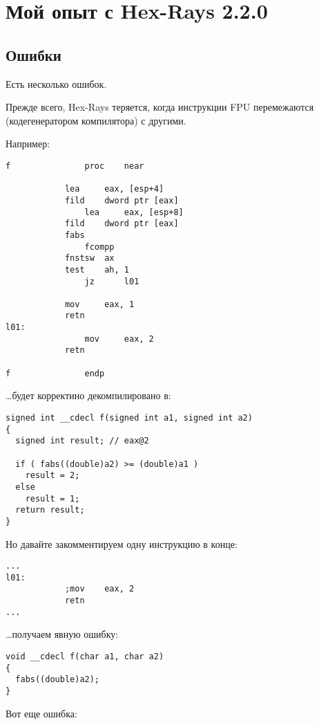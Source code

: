\section{Мой опыт с Hex-Rays 2.2.0}
\label{hex_rays}

\subsection{Ошибки}

Есть несколько ошибок.

Прежде всего, Hex-Rays теряется, когда инструкции \ac{FPU} перемежаются (кодегенератором компилятора) с другими.

Например:

\begin{lstlisting}
f               proc    near

        	lea     eax, [esp+4]
	        fild    dword ptr [eax]
                lea     eax, [esp+8]
        	fild    dword ptr [eax]
	        fabs
                fcompp
        	fnstsw  ax
	        test    ah, 1
                jz      l01

        	mov     eax, 1
	        retn
l01:
                mov     eax, 2
	        retn

f               endp
\end{lstlisting}

\dots будет корректино декомпилировано в:

\begin{lstlisting}
signed int __cdecl f(signed int a1, signed int a2)
{
  signed int result; // eax@2

  if ( fabs((double)a2) >= (double)a1 )
    result = 2;
  else
    result = 1;
  return result;
}
\end{lstlisting}

Но давайте закомментируем одну инструкцию в конце:

\begin{lstlisting}
...
l01:
	        ;mov    eax, 2
        	retn
...
\end{lstlisting}

\dots получаем явную ошибку:

\begin{lstlisting}
void __cdecl f(char a1, char a2)
{
  fabs((double)a2);
}
\end{lstlisting}

Вот еще ошибка:

